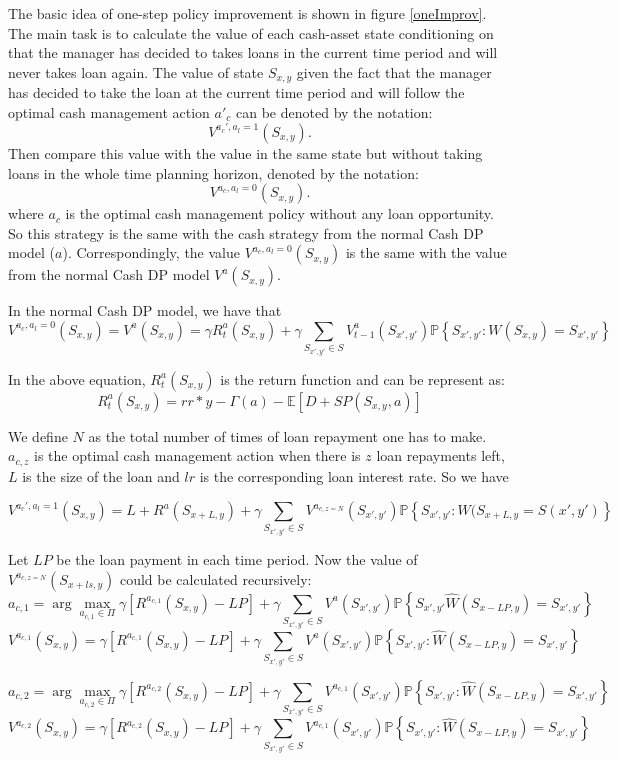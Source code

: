 \documentclass[12pt]{article}
\begin{document}
The basic idea of one-step policy improvement is shown in figure \ref{oneImprov}. The main task is to calculate the value of each cash-asset state conditioning on that the manager has decided to takes loans in the current time period and will never takes loan again. The value of state $S_{x,y}$ given the fact that the manager has decided to take the loan at the current time period and will follow the optimal cash management action $a'_c$ can be denoted by the notation: $$V^{{a_c}', a_l = 1}(S_{x,y}).$$
Then compare this value with the value in the same state but without taking loans in the whole time planning horizon, denoted by the notation: $$V^{{a_c}, a_l = 0}(S_{x,y}).$$ where $a_c$ is the optimal cash management policy without any loan opportunity. So this strategy is the same with the cash strategy from the normal Cash DP model ($a$). Correspondingly, the value $V^{{a_c}, a_l = 0}(S_{x,y})$ is the same with the value from the normal Cash DP model $V^a(S_{x,y}).$


In the normal Cash DP model, we have that $$V^{a_c, a_l =0}(S_{x,y})= V^a(S_{x,y}) =    \gamma R_t^{a}(S_{x,y}) + \gamma \sum_{S_{x',y'}\in S} V^{a}_{t-1}(S_{x',y'})
\mathbb{P}\left\{S_{x',y'}:W(S_{x, y}) = S_{x', y'} \right\}$$

In the above equation, $R^{a}_t(S_{x,y})$ is the return function and can be represent as:$$ R^{a}_t(S_{x,y}) = rr*y - \Gamma(a) - \mathbb{E}[D+SP(S_{x,y},a)]$$


We define $N$ as the total number of times of loan repayment one has to make. $a_{c, z}$ is the optimal cash management action when there is $z$ loan repayments left,  $L$ is the size of the loan and $lr$ is the corresponding loan interest rate. So we have 

$$V^{a_c', a_l = 1}(S_{x,y}) = L+R^{a}(S_{x+L,y}) + \gamma \sum_{S_{x',y'}\in S }V^{a_{c,z=N}}(S_{x',y'}) \mathbb{P}\left\{ S_{x',y'} : W(S_{x+L,y}=S(x',y')\right\}$$



Let $LP$ be the loan payment in each time period. Now the value of  $V^{a_{c,z=N}}(S_{x+ls, y})$ could be calculated recursively: 
$$a_{c,1} = \arg \max_{a_{c,1} \in \Pi} \gamma [R^{a_{c,1}} (S_{x,y}) - LP] + \gamma  \sum_{S_{x',y'}\in S} V^a(S_{x',y'})\mathbb{P}\left\{S_{x',y'}\widehat{W}(S_{x-LP, y}) = S_{x', y'} \right\}$$
$$ V^{a_{c,1}}(S_{x,y}) = \gamma [R^{a_{c,1}} (S_{x,y}) - LP] + \gamma  \sum_{S_{x',y'}\in S} V^a(S_{x',y'})\mathbb{P}\left\{S_{x',y'}:\widehat{W}(S_{x-LP, y}) = S_{x', y'} \right\}$$

$$a_{c,2} = \arg \max_{a_{c,2} \in \Pi} \gamma  [R^{a_{c,2}} (S_{x,y}) - LP]  + \gamma  \sum_{S_{x',y'}\in S} V^{a_{c,1}}(S_{x',y'}) \mathbb{P}\left\{S_{x',y'}:\widehat{W}(S_{x-LP, y}) = S_{x', y'} \right\}$$
$$ V^{a_{c,2}}(S_{x,y}) = \gamma  [R^{a_{c,2}} (S_{x,y}) - LP]   + \gamma  \sum_{S_{x',y'}\in S} V^{a_{c,1}}(S_{x',y'}) \mathbb{P}\left\{S_{x',y'}:\widehat{W}(S_{x-LP, y}) = S_{x', y'} \right\}$$
\end{document}
